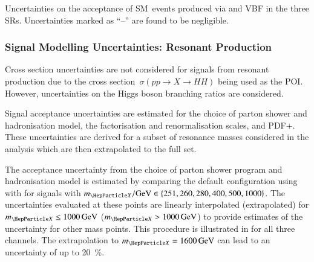 \begin{table}[htbp]
  \centering

  \caption[Unceratinties on the acceptance of SM~\HH events in the
  SRs.]{Uncertainties on the acceptance of SM~\HH events produced via \ggF and
    VBF in the three SRs. Uncertainties marked as ``--'' are found to be
    negligible.}%
  \label{tab:theory_uncertainty_signal}

  
\end{table}


\subsubsection{Signal Modelling Uncertainties: Resonant \HH Production}

Cross section uncertainties are not considered for signals from resonant \HH
production due to the cross section~$\sigma(pp \to X \to HH)$ being used as the
POI. However, uncertainties on the Higgs boson branching ratios are considered.

Signal acceptance uncertainties are estimated for the choice of parton shower
and hadronisation model, the factorisation and renormalisation scales, and
PDF+\alphas. These uncertainties are derived for a subset of resonance masses
considered in the analysis
which are then extrapolated to the full set.

The acceptance uncertainty from the choice of parton shower program and
hadronisation model is estimated by comparing the default configuration using
\HERWIG[7] with \PYTHIA[8] for signals with
\mbox{$\mX / \si{\GeV} \in \left\{ 251, 260, 280, 400, 500, 1000 \right\}$}.
The uncertainties evaluated at these points are linearly interpolated
(extrapolated) for $\mX \leq \SI{1000}{\GeV}$ ($\mX > \SI{1000}{\GeV}$) to
provide estimates of the uncertainty for other mass points. This procedure is
illustrated in  for all three channels. The
extrapolation to $\mX = \SI{1600}{\GeV}$ can lead to an uncertainty of up to
\SI{20}{\percent}.

